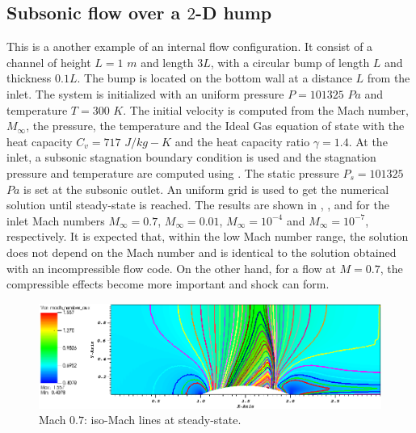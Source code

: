 \subsection{Subsonic flow over a $2$-D hump} \label{sec:hump}
This is a another example of an internal flow configuration. It consist of a channel of height $L=1$ $m$ and length $3L$, with a circular bump of length $L$ and thickness $0.1L$. The bump is located on the bottom wall at a distance $L$ from the inlet. The system is initialized with an uniform pressure $P=101325$ $Pa$ and temperature $T=300$ $K$. The initial velocity is computed from the Mach number, $M_{\infty}$, the pressure, the temperature and the Ideal Gas equation of state with the heat capacity $C_v = 717$ $J/kg-K$ and the heat capacity ratio $\gamma=1.4$. At the inlet, a subsonic stagnation boundary condition is used and the stagnation pressure and temperature are computed using .
The static pressure $P_s = 101325$ $Pa$ is set at the subsonic outlet. An uniform grid is used to get the numerical solution until steady-state is reached. The results are shown in , ,  and  for the inlet Mach numbers $M_{\infty}=0.7$, $M_{\infty}=0.01$, $M_{\infty}=10^{-4}$ and $M_{\infty}=10^{-7}$, respectively. It is expected that, within the low Mach number range, the solution does not depend on the Mach number and is identical to the solution obtained with an incompressible flow code. On the other hand, for a flow at $M=0.7$, the compressible effects become more important and shock can form.
        \begin{figure}[H]%
                \centering
                \includegraphics[scale=.50]{figures/Hump2D_mach_0p7.png}
                \caption{Mach $0.7$: iso-Mach lines at steady-state.}
                \label{fig:2d_hump_mach_0p7}
        \end{figure}%
